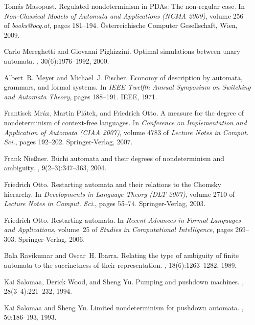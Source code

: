 \documentclass[copyright]{eptcs}
\begin{document}
\begin{thebibliography}{10}
Tom{\'a}s Masopust.
\newblock Regulated nondeterminism in {PDA}s: The non-regular case.
\newblock In {\em Non-Classical Models of Automata and Applications ({NCMA}
  2009)}, volume 256 of {\em books@ocg.at}, pages 181--194. {\"O}sterreichische
  Computer Gesellschaft, Wien, 2009.

Carlo Mereghetti and Giovanni Pighizzini.
\newblock Optimal simulations between unary automata.
, 30(6):1976--1992, 2000.

Albert~R. Meyer and Michael~J. Fischer.
\newblock Economy of description by automata, grammars, and formal systems.
\newblock In {\em IEEE Twelfth Annual Symposium on Switching and Automata
  Theory}, pages 188--191. IEEE, 1971.

Frantisek Mr{\'a}z, Martin Pl{\'a}tek, and Friedrich Otto.
\newblock A measure for the degree of nondeterminism of context-free languages.
\newblock In {\em Conference on Implementation and Application of Automata
  (CIAA 2007)}, volume 4783 of {\em Lecture Notes in Comput. Sci.}, pages
  192--202. Springer-Verlag, 2007.

Frank Nie{\ss}ner.
\newblock B{\"u}chi automata and their degrees of nondeterminism and ambiguity.
, 9(2--3):347--363, 2004.

Friedrich Otto.
\newblock Restarting automata and their relations to the {C}homsky hierarchy.
\newblock In {\em Developments in Language Theory (DLT 2007)}, volume 2710 of
  {\em Lecture Notes in Comput. Sci.}, pages 55--74. Springer-Verlag, 2003.

Friedrich Otto.
\newblock Restarting automata.
\newblock In {\em Recent Advances in Formal Languages and Applications},
  volume~25 of {\em Studies in Computational Intelligence}, pages 269--303.
  Springer-Verlag, 2006.

Bala Ravikumar and Oscar~H. Ibarra.
\newblock Relating the type of ambiguity of finite automata to the succinctness
  of their representation.
, 18(6):1263--1282, 1989.

Kai Salomaa, Derick Wood, and Sheng Yu.
\newblock Pumping and pushdown machines.
, 28(3--4):221--232, 1994.

Kai Salomaa and Sheng Yu.
\newblock Limited nondeterminism for pushdown automata.
, 50:186--193, 1993.


\end{thebibliography}
\end{document}
